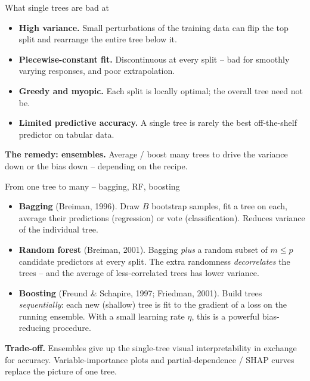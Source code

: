 \documentclass[10pt,ignorenonframetext,aspectratio=169]{beamer}
\begin{document}
\begin{frame}{What single trees are bad at}
\begin{itemize}
    \justifying
    \item \textbf{High variance.} Small perturbations of the training data can flip the top split and rearrange the entire tree below it.
    \item \textbf{Piecewise-constant fit.} Discontinuous at every split -- bad for smoothly varying responses, and poor extrapolation.
    \item \textbf{Greedy and myopic.} Each split is locally optimal; the overall tree need not be.
    \item \textbf{Limited predictive accuracy.} A single tree is rarely the best off-the-shelf predictor on tabular data.
\end{itemize}

\medskip
\textbf{The remedy: ensembles.} Average / boost many trees to drive the variance down or the bias down -- depending on the recipe.
\end{frame}


\begin{frame}{From one tree to many -- bagging, RF, boosting}
\begin{itemize}
    \justifying
    \item \textbf{Bagging} (Breiman, 1996). Draw $B$ bootstrap samples, fit a tree on each, average their predictions (regression) or vote (classification). Reduces variance of the individual tree.
    \item \textbf{Random forest} (Breiman, 2001). Bagging \emph{plus} a random subset of $m \le p$ candidate predictors at every split. The extra randomness \emph{decorrelates} the trees -- and the average of less-correlated trees has lower variance.
    \item \textbf{Boosting} (Freund \& Schapire, 1997; Friedman, 2001). Build trees \emph{sequentially}: each new (shallow) tree is fit to the gradient of a loss on the running ensemble. With a small learning rate $\eta$, this is a powerful bias-reducing procedure.
\end{itemize}

\medskip
\textbf{Trade-off.} Ensembles give up the single-tree visual interpretability in exchange for accuracy. Variable-importance plots and partial-dependence / SHAP curves replace the picture of one tree.
\end{frame}
\end{document}
